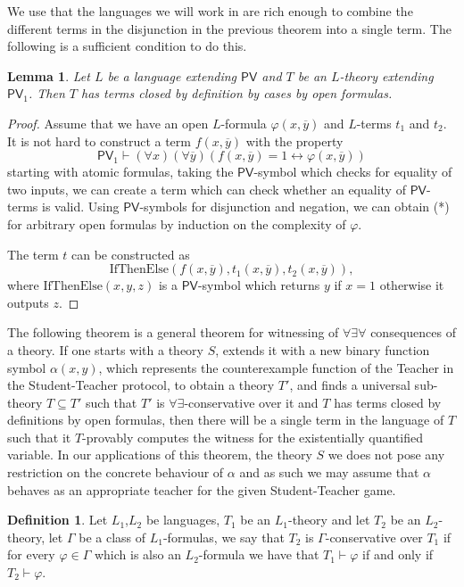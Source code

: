 \documentclass[11pt]{article}
\newcommand{\PV}{\mathsf{PV}}
\newtheorem{lemma}[theorem]{Lemma}
\theoremstyle{definition}
\theoremstyle{definition}
\newtheorem{definition}[theorem]{Definition}
\theoremstyle{remark}
\begin{document}
We use that the languages we will work in are rich enough to combine the different terms in the disjunction in the previous theorem into a single term. The following is a sufficient condition to do this.

\begin{lemma}\label{lemmapvifthenelse}
    Let $L$ be a language extending $\PV$ and $T$ be an $L$-theory extending $\PV_1$. Then $T$ has terms closed by definition by cases by open formulas.
\end{lemma}
\begin{proof}
    Assume that we have an open $L$-formula $\varphi(x,\overline y)$ and $L$-terms $t_1$ and $t_2$. It is not hard to construct a term $f(x,\overline y)$ with the property
    \[\PV_1\vdash (\forall x)(\forall \overline y)(f(x,\overline y)=1 \leftrightarrow \varphi(x,\overline y))\tag{*}\]
    starting with atomic formulas, taking the $\PV$-symbol which checks for equality of two inputs, we can create a term which can check whether an equality of $\PV$-terms is valid. Using $\PV$-symbols for disjunction and negation, we can obtain (*) for arbitrary open formulas by induction on the complexity of $\varphi$.

    The term $t$ can be constructed as 
    \[\text{IfThenElse}(f(x,\overline y),t_1(x,\overline y),t_2(x, \overline y)),\]
    where $\text{IfThenElse}(x,y,z)$ is a $\PV$-symbol which returns $y$ if $x=1$ otherwise it outputs $z$.
\end{proof}

The following theorem is a general theorem for witnessing of $\forall\exists \forall$ consequences of a theory. If one starts with a theory $S$, extends it with a new binary function symbol $\alpha(x,y)$, which represents the counterexample function of the Teacher in the Student-Teacher protocol, to obtain a theory $T'$, and finds a universal sub-theory $T\subseteq T'$ such that $T'$ is $\forall\exists$-conservative over it and $T$ has terms closed by definitions by open formulas, then there will be a single term in the language of $T$ such that it $T$-provably computes the witness for the existentially quantified variable. In our applications of this theorem, the theory $S$ we does not pose any restriction on the concrete behaviour of $\alpha$ and as such we may assume that $\alpha$ behaves as an appropriate teacher for the given Student-Teacher game. 

\begin{definition}
    Let $L_1$,$L_2$ be languages, $T_1$ be an $L_1$-theory and let $T_2$ be an $L_2$-theory, let $\Gamma$ be a class of $L_1$-formulas, we say that $T_2$ is $\Gamma$-conservative over $T_1$ if for every $\varphi\in\Gamma$ which is also an $L_2$-formula we have that $T_1\vdash \varphi$ if and only if $T_2\vdash \varphi$.
\end{definition}
\end{document}
